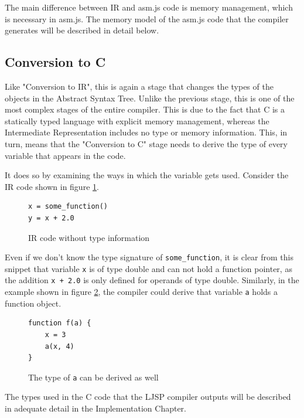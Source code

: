 \documentclass[11pt]{report}
\begin{document}
The main difference between IR and asm.js code is memory management, which is necessary in asm.js. The memory model of the asm.js code that the compiler generates will be described in detail below.


\subsection{Conversion to C}
Like "Conversion to IR", this is again a stage that changes the types of the objects in the Abstract Syntax Tree. Unlike the previous stage, this is one of the most complex stages of the entire compiler. This is due to the fact that C is a statically typed language with explicit memory management, whereas the Intermediate Representation includes no type or memory information. This, in turn, means that the "Conversion to C" stage needs to derive the type of every variable that appears in the code.

It does so by examining the ways in which the variable gets used. Consider the IR code shown in figure \ref{convc1}.
\begin{figure}[ht]
\begin{lstlisting}
x = some_function()
y = x + 2.0
\end{lstlisting}
\caption{IR code without type information}
\label{convc1}
\end{figure}

Even if we don't know the type signature of \texttt{some_function}, it is clear from this snippet that variable \texttt{x} is of type double and can not hold a function pointer, as the addition \texttt{x + 2.0} is only defined for operands of type double. Similarly, in the example shown in figure \ref{convc2}, the compiler could derive that variable \texttt{a} holds a function object.
\begin{figure}[ht]
\begin{lstlisting}
function f(a) {
    x = 3
    a(x, 4)
}
\end{lstlisting}
\caption{The type of \texttt{a} can be derived as well}
\label{convc2}
\end{figure}

The types used in the C code that the LJSP compiler outputs will be described in adequate detail in the Implementation Chapter.
\end{document}
